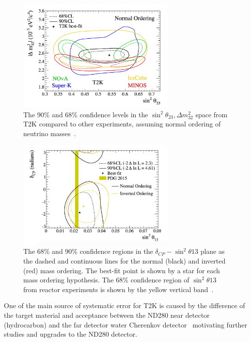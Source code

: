 \begin{figure}[h!]
\centering
  \centering
\includegraphics[width=0.7\textwidth]{figures/t2k2.jpeg}
\vspace{2mm}
\caption{The 90\% and 68\% confidence levels in the $\sin^2 \theta_{23}, \Delta m^2_{32}$ space from T2K compared to other experiments, assuming normal ordering of neutrino masses~\cite{T2Kfigures}.}
\label{fig:T2K23}
\end{figure}

\begin{figure}[h!]
\centering
  \centering
\includegraphics[width=0.7\textwidth]{figures/t2kfix.jpeg}
\vspace{2mm}
\caption{The 68\% and 90\% confidence regions in the $\delta_{CP} - \sin^2 \theta{13}$ plane as the dashed and continuous lines for the normal (black) and inverted (red) mass ordering. The best-fit point is shown by a star for each mass ordering hypothesis. The 68\% confidence region of $\sin^2 \theta{13}$ from reactor experiments is shown by the yellow vertical band~\cite{108Abe}.}
\label{fig:T2K12}
\end{figure}

One of the main source of systematic error for T2K is caused by the difference of the target material and acceptance between the ND280 near detector (hydrocarbon) and the far detector water Cherenkov detector~\cite{T2Kpaper} motivating further studies and upgrades to the ND280 detector.

